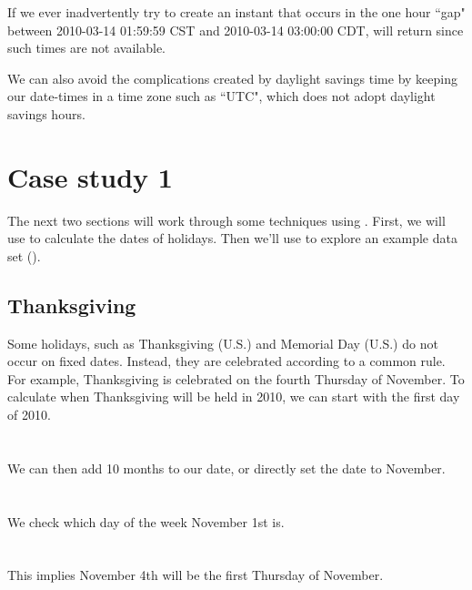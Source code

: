\documentclass[article]{jss}
\begin{document}
If we ever inadvertently try to create an instant that occurs in the one hour ``gap" between 2010-03-14 01:59:59 CST  and 2010-03-14 03:00:00 CDT,  will return  since such times are not available.

We can also avoid the complications created by daylight savings time by keeping our date-times in a time zone such as ``UTC", which does not adopt daylight savings hours.

\section{Case study 1}

The next two sections will work through some techniques using . First, we will use  to calculate the dates of  holidays. Then we'll use  to explore an example data set ().

\subsection{Thanksgiving}
Some holidays, such as Thanksgiving (U.S.) and Memorial Day (U.S.) do not occur on fixed dates. Instead, they are celebrated according to a common rule. For example, Thanksgiving is celebrated on the fourth Thursday of November. To calculate when Thanksgiving will be held in 2010, we can start with the first day of 2010.\\

\\
\\

We can then add 10 months to our date, or directly set the date to November.\\

\\
\\

We check which day of the week November 1st is.\\

\\
\\

This implies November 4th will be the first Thursday of November.\\

\\
\\
\\
\\
\end{document}
